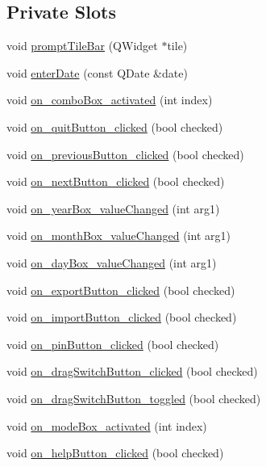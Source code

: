 \subsection*{Private Slots}
\begin{DoxyCompactItemize}
\item 
void \hyperlink{classMainWindow_a0b149c5bca3c35a39c919fe9581be2dd}{prompt\+Tile\+Bar} (Q\+Widget $\ast$tile)
\item 
void \hyperlink{classMainWindow_a407c21579299391a8d3e34f5b3af362e}{enter\+Date} (const Q\+Date \&date)
\item 
void \hyperlink{classMainWindow_a20dbb80de6c861f26ae88c4588ca6cf2}{on\+\_\+combo\+Box\+\_\+activated} (int index)
\item 
void \hyperlink{classMainWindow_aca2f10b04ded003c6da32e81c898d16e}{on\+\_\+quit\+Button\+\_\+clicked} (bool checked)
\item 
void \hyperlink{classMainWindow_a228228aec016d5f37ef06dc62ad0c42a}{on\+\_\+previous\+Button\+\_\+clicked} (bool checked)
\item 
void \hyperlink{classMainWindow_ad1a550b59a2a3a2a0b48f2f63e8071eb}{on\+\_\+next\+Button\+\_\+clicked} (bool checked)
\item 
void \hyperlink{classMainWindow_a906e1abeb5bda05405106d78779872e3}{on\+\_\+year\+Box\+\_\+value\+Changed} (int arg1)
\item 
void \hyperlink{classMainWindow_a369ef8f03c1c6e986418234bd462ab06}{on\+\_\+month\+Box\+\_\+value\+Changed} (int arg1)
\item 
void \hyperlink{classMainWindow_ac985b15a3e2b9a28ca2e319fb039d1d7}{on\+\_\+day\+Box\+\_\+value\+Changed} (int arg1)
\item 
void \hyperlink{classMainWindow_a0ae56967e1df87215428eb9f91df9ba0}{on\+\_\+export\+Button\+\_\+clicked} (bool checked)
\item 
void \hyperlink{classMainWindow_a42193cb2a4a2cac74da5a8291ab5bd96}{on\+\_\+import\+Button\+\_\+clicked} (bool checked)
\item 
void \hyperlink{classMainWindow_ae779988974613e15ccb434645f474d8f}{on\+\_\+pin\+Button\+\_\+clicked} (bool checked)
\item 
void \hyperlink{classMainWindow_a9e6103352c52b8e96959a71919ad4cf9}{on\+\_\+drag\+Switch\+Button\+\_\+clicked} (bool checked)
\item 
void \hyperlink{classMainWindow_a0679e38138ca8bfdf6a877cbc821b21b}{on\+\_\+drag\+Switch\+Button\+\_\+toggled} (bool checked)
\item 
void \hyperlink{classMainWindow_a4cd877b54dd972c62fa97553191d69c1}{on\+\_\+mode\+Box\+\_\+activated} (int index)
\item 
void \hyperlink{classMainWindow_af5c3bae5874c9868604a90ee6071cc04}{on\+\_\+help\+Button\+\_\+clicked} (bool checked)
\end{DoxyCompactItemize}
